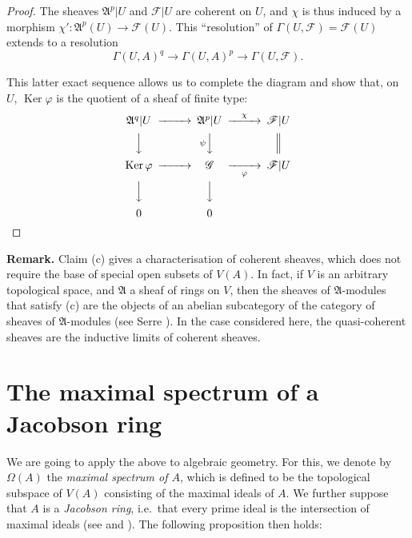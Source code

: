 \documentclass[british]{article}
\newenvironment{rmenv}[1]
  {\phantomsection\par\smallskip\noindent\textbf{#1.}\rmfamily}
  {\par\smallskip}
\newcommand{\oldpage}[1]{\marginpar{\footnotesize$\Big\vert$ \textit{p.~#1}}}
\begin{document}
\begin{proof}
The sheaves \(\mathfrak{A}^p|U\) and \({\mathscr{F}}|U\) are coherent on
\(U\), and \(\chi\) is thus induced by a morphism
\(\chi'\colon\mathfrak{A}^p(U)\to{\mathscr{F}}(U)\). This ``resolution''
of \(\Gamma(U,{\mathscr{F}})={\mathscr{F}}(U)\) extends to a resolution
\[
  \Gamma(U,A)^q \to \Gamma(U,A)^p \to \Gamma(U,{\mathscr{F}}).
\]

This latter exact sequence allows us to complete the diagram and show
that, on \(U\), \(\operatorname{Ker}\varphi\) is the quotient of a sheaf
of finite type: \[
  \begin{CD}
    \mathfrak{A}^q|U @>>> \mathfrak{A}^p|U @>{\chi}>> {\mathscr{F}}|U
  \\@VVV @V{\psi}VV @|
  \\\operatorname{Ker}\varphi @>>> {\mathscr{G}} @>>{\varphi}> {\mathscr{F}}|U
  \\@VVV @VVV @.
  \\0 @. 0 @.
  \end{CD}
\]
\end{proof}

\oldpage{1-11}

\protect{}\label{remark-theorem-3}
\begin{rmenv}{Remark}
Claim (c) gives a characterisation of coherent sheaves, which does not
require the base of special open subsets of \(V(A)\). In fact, if \(V\)
is an arbitrary topological space, and \(\mathfrak{A}\) a sheaf of rings
on \(V\), then the sheaves of \(\mathfrak{A}\)-modules that satisfy (c)
are the objects of an abelian subcategory of the category of sheaves of
\(\mathfrak{A}\)-modules (see Serre \autocite{4}). In the case
considered here, the quasi-coherent sheaves are the inductive limits of
coherent sheaves.

\end{rmenv}

\section{The maximal spectrum of a Jacobson ring}\label{section-5}

We are going to apply the above to algebraic geometry. For this, we
denote by \(\Omega(A)\) the \emph{maximal spectrum of \(A\)}, which is
defined to be the topological subspace of \(V(A)\) consisting of the
maximal ideals of \(A\). We further suppose that \(A\) is a
\emph{Jacobson ring}, i.e.~that every prime ideal is the intersection of
maximal ideals (see \autocite{1} and \autocite{3}). The following
proposition then holds:
\end{document}
